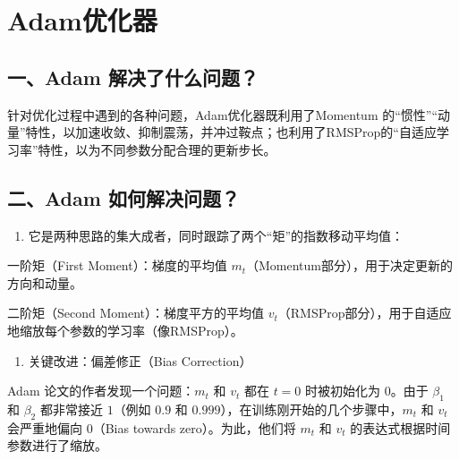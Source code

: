 \setcounter{section}{3}

\hypertarget{adamux4f18ux5316ux5668}{%
\section{Adam优化器}\label{adamux4f18ux5316ux5668}}

\hypertarget{ux4e00adam-ux89e3ux51b3ux4e86ux4ec0ux4e48ux95eeux9898}{%
\subsection{一、Adam 解决了什么问题？}\label{ux4e00adam-ux89e3ux51b3ux4e86ux4ec0ux4e48ux95eeux9898}}

针对优化过程中遇到的各种问题，Adam优化器既利用了Momentum 的``惯性''``动量''特性，以加速收敛、抑制震荡，并冲过鞍点；也利用了RMSProp的``自适应学习率''特性，以为不同参数分配合理的更新步长。

\hypertarget{ux4e8cadam-ux5982ux4f55ux89e3ux51b3ux95eeux9898}{%
\subsection{二、Adam 如何解决问题？}\label{ux4e8cadam-ux5982ux4f55ux89e3ux51b3ux95eeux9898}}

\begin{enumerate}
\def\labelenumi{\arabic{enumi}.}
\tightlist
\item
{}
  它是两种思路的集大成者，同时跟踪了两个``矩''的指数移动平均值：
\end{enumerate}

一阶矩（First Moment）：梯度的平均值 \(m_t\)（Momentum部分），用于决定更新的方向和动量。

二阶矩（Second Moment）：梯度平方的平均值 \(v_t\)（RMSProp部分），用于自适应地缩放每个参数的学习率（像RMSProp）。

\begin{enumerate}
\def\labelenumi{\arabic{enumi}.}
\setcounter{enumi}{1}
\tightlist
\item
  关键改进：偏差修正（Bias Correction）
\end{enumerate}

Adam 论文的作者发现一个问题：\(m_t\) 和 \(v_t\) 都在 \(t=0\) 时被初始化为 \(0\)。由于 \(\beta_1\) 和 \(\beta_2\) 都非常接近 \(1\)（例如 \(0.9\) 和 \(0.999\)），在训练刚开始的几个步骤中，\(m_t\) 和 \(v_t\) 会严重地偏向 \(0\)（Bias towards zero）。为此，他们将 \(m_t\) 和 \(v_t\) 的表达式根据时间参数进行了缩放。

